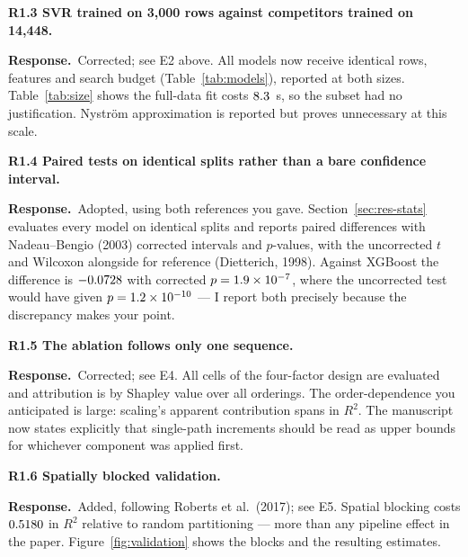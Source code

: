\documentclass[11pt,a4paper]{article}
\newcommand{\reply}{\par\noindent\textbf{Response.}\ }
\newcommand{\pt}[1]{\par\medskip\noindent\textbf{#1}\par}
\begin{document}
\pt{R1.3 SVR trained on 3{,}000 rows against competitors trained on 14{,}448.}
\reply Corrected; see E2 above. All \NModels{} models now receive identical rows, features
and search budget (Table~\ref{tab:models}), reported at both sizes. Table~\ref{tab:size} shows the full-data fit costs
$8.3$~s, so the subset had no justification. Nystr\"om approximation is reported
but proves unnecessary at this scale.

\pt{R1.4 Paired tests on identical splits rather than a bare confidence interval.}
\reply Adopted, using both references you gave. Section~\ref{sec:res-stats} evaluates every model on
\StatSplits{} identical splits and reports paired differences with Nadeau--Bengio (2003)
corrected intervals and $p$-values, with the uncorrected $t$ and Wilcoxon alongside for
reference (Dietterich, 1998). Against XGBoost the difference is $-0.0728$ with corrected
$p = 1.9\times 10^{-7}$, where the uncorrected test would have given $p = 1.2\times 10^{-10}$ --- I
report both precisely because the discrepancy makes your point.

\pt{R1.5 The ablation follows only one sequence.}
\reply Corrected; see E4. All \AblNcells{} cells of the four-factor design are evaluated and
attribution is by Shapley value over all \AblNorders{} orderings. The order-dependence you
anticipated is large: scaling's apparent contribution spans \RangeScal{} in $R^2$. The
manuscript now states explicitly that single-path increments should be read as upper bounds
for whichever component was applied first.

\pt{R1.6 Spatially blocked validation.}
\reply Added, following Roberts et al.\ (2017); see E5. Spatial blocking costs
$0.5180$ in $R^2$ relative to random partitioning --- more than any pipeline effect
in the paper. Figure~\ref{fig:validation} shows the blocks and the resulting estimates.
\end{document}
